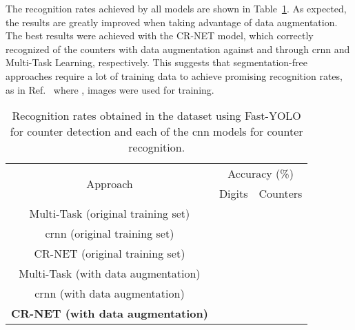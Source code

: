 The recognition rates achieved by all models are shown in Table~\ref{tab:results_recognition}.  As expected, the results are greatly improved when taking advantage of data augmentation. The best results were achieved with the CR-NET model, which correctly recognized \REV{\%} of the counters with data augmentation against \REV{\%} and \REV{\%} through \gls*{crnn} and Multi-Task Learning, respectively. This suggests that segmentation-free approaches require a lot of training data to achieve promising recognition rates, as in Ref.~ where , images were used for training.

\begin{table}[!htb]
\caption{Recognition rates obtained in the \dataset dataset using Fast-YOLO for counter detection and each of the \gls*{cnn} models for counter recognition.}
\label{tab:results_recognition}
\vspace{-2mm}
\begin{center}
\begin{tabular}{@{}ccc@{}}
\toprule
\multicolumn{1}{c}{\multirow{2}{*}{Approach}} & \multicolumn{2}{c}{Accuracy (\%)} \\
\multicolumn{1}{c}{} & Digits & Counters \\ \midrule
Multi-Task (original training set) & \REV{} & \REV{} \\
\gls*{crnn} (original training set) & \REV{} &  \REV{} \\
CR-NET (original training set) & \REV{} & \REV{} \\ \midrule
Multi-Task (with data augmentation) & \REV{} & \REV{} \\
\gls*{crnn} (with data augmentation)  & \REV{} & \REV{} \\
\textbf{CR-NET (with data augmentation)} & \REV{} & \REV{} \\ \bottomrule
\end{tabular}
\end{center}
\end{table}

